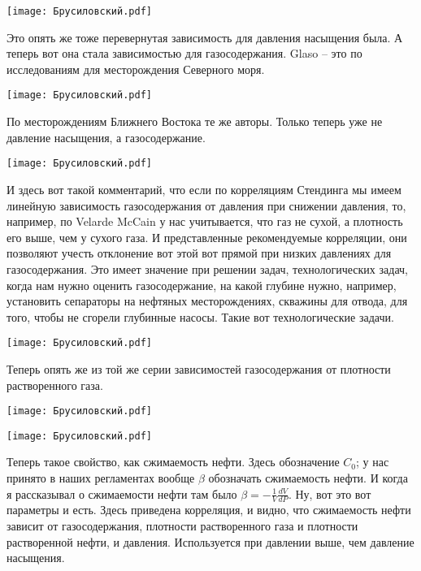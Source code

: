 \documentclass[main.tex]{subfiles}
\begin{document}
\begin{center}
\texttt{[image: Брусиловский.pdf]}
\end{center}

Это опять же тоже перевернутая зависимость для давления насыщения была.
А теперь вот она стала зависимостью для газосодержания.
Glaso -- это по исследованиям для месторождения Северного моря.

\begin{center}
\texttt{[image: Брусиловский.pdf]}
\end{center}

По месторождениям Ближнего Востока те же авторы.
Только теперь уже не давление насыщения, а газосодержание.

\begin{center}
\texttt{[image: Брусиловский.pdf]}
\end{center}

И здесь вот такой комментарий, что если по корреляциям Стендинга мы имеем линейную зависимость газосодержания от давления при снижении давления, то, например, по Velarde McCain у нас учитывается, что газ не сухой, а плотность его выше, чем у сухого газа.
И представленные рекомендуемые корреляции, они позволяют учесть отклонение вот этой вот прямой при низких давлениях для газосодержания.
Это имеет значение при решении задач, технологических задач, когда нам нужно оценить газосодержание, на какой глубине нужно, например, установить сепараторы на нефтяных месторождениях, скважины для отвода, для того, чтобы не сгорели глубинные насосы.
Такие вот технологические задачи.

\begin{center}
\texttt{[image: Брусиловский.pdf]}
\end{center}

Теперь опять же из той же серии зависимостей газосодержания от плотности растворенного газа.

\begin{center}
\texttt{[image: Брусиловский.pdf]}
\end{center}

\begin{center}
\texttt{[image: Брусиловский.pdf]}
\end{center}

Теперь такое свойство, как сжимаемость нефти.
Здесь обозначение $C_{0}$; у нас принято в наших регламентах вообще $\beta$ обозначать сжимаемость нефти.
И когда я рассказывал о сжимаемости нефти там было $\beta=-\frac{1}{V}\frac{dV}{dP}$.
Ну, вот это вот параметры и есть.
Здесь приведена корреляция, и видно, что сжимаемость нефти зависит от газосодержания, плотности растворенного газа и плотности растворенной нефти, и давления.
Используется при давлении выше, чем давление насыщения.
\end{document}
